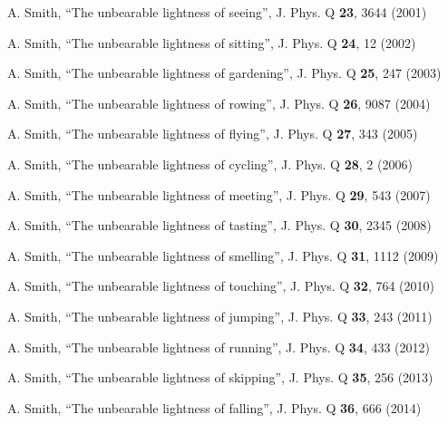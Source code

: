 \documentclass[aps,pra,a4paper,nofootinbib,preprint,12pt]{revtex4-1} %
\begin{document}
\begin{thebibliography}{99}


A. Smith, ``The unbearable lightness of seeing'', J. Phys. Q \textbf{23}, 3644 (2001)

A. Smith, ``The unbearable lightness of sitting'', J. Phys. Q \textbf{24}, 12 (2002)

A. Smith, ``The unbearable lightness of gardening'', J. Phys. Q \textbf{25}, 247 (2003)

A. Smith, ``The unbearable lightness of rowing'', J. Phys. Q \textbf{26}, 9087 (2004)

A. Smith, ``The unbearable lightness of flying'', J. Phys. Q \textbf{27}, 343 (2005)

A. Smith, ``The unbearable lightness of cycling'', J. Phys. Q \textbf{28}, 2 (2006)

A. Smith, ``The unbearable lightness of meeting'', J. Phys. Q \textbf{29}, 543 (2007)

A. Smith, ``The unbearable lightness of tasting'', J. Phys. Q \textbf{30}, 2345 (2008)

A. Smith, ``The unbearable lightness of smelling'', J. Phys. Q \textbf{31}, 1112 (2009)

A. Smith, ``The unbearable lightness of touching'', J. Phys. Q \textbf{32}, 764 (2010)

A. Smith, ``The unbearable lightness of jumping'', J. Phys. Q \textbf{33}, 243 (2011)

A. Smith, ``The unbearable lightness of running'', J. Phys. Q \textbf{34}, 433 (2012)

A. Smith, ``The unbearable lightness of skipping'', J. Phys. Q \textbf{35}, 256 (2013)

A. Smith, ``The unbearable lightness of falling'', J. Phys. Q \textbf{36}, 666 (2014)


\end{thebibliography}
\end{document}
